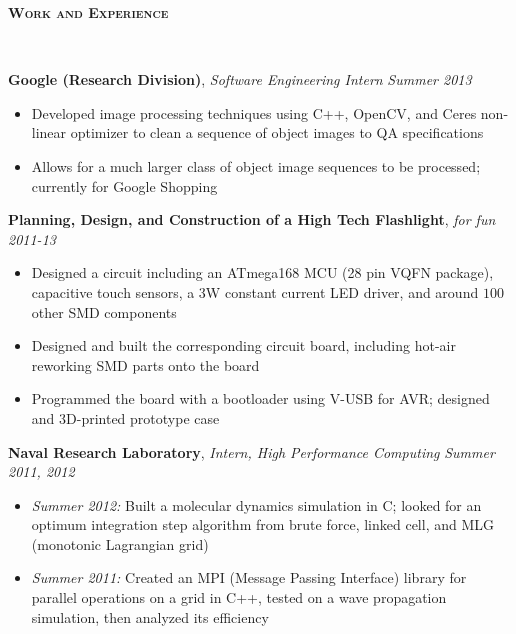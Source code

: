 \documentclass{article}
\newenvironment{changemargin}[2]{%
  \begin{list}{}{%
    \setlength{\topsep}{0pt}%
    \setlength{\leftmargin}{#1}%
    \setlength{\rightmargin}{#2}%
    \setlength{\listparindent}{\parindent}%
    \setlength{\itemindent}{\parindent}%
    \setlength{\parsep}{\parskip}%
  }%
  \item[]}{\end{list}
}
\newcommand{\lineover}{
	\begin{changemargin}{-0.05in}{-0.05in}
		\vspace*{-8pt}
		\hrulefill \\
		\vspace*{-2pt}
	\end{changemargin}
}
\newcommand{\header}[1]{
	\begin{changemargin}{-0.5in}{-0.5in}
		{\large \textbf{\scshape{#1}}}\\
  	\lineover
	\end{changemargin}
}
\newenvironment{body} {
	\vspace*{-16pt}
	\begin{changemargin}{-0.25in}{-0.5in}
  }	
	{\end{changemargin}
}
\begin{document}
\smallskip


\header{Work and Experience}

\begin{body}
	\vspace{14pt}
	\textbf{Google (Research Division)}, \emph{Software Engineering Intern} \hfill \emph{Summer 2013}\\
	\vspace*{-4pt}
	\begin{itemize}
		\item Developed image processing techniques using C++, OpenCV, and Ceres non-linear optimizer to clean a sequence of object images to QA specifications
		\item Allows for a much larger class of object image sequences to be processed; currently for Google Shopping
	\end{itemize}
	
	\medskip
	
	\textbf{Planning, Design, and Construction of a High Tech Flashlight}, \emph{for fun} \hfill \emph{2011-13}\\
	\vspace*{-4pt}
	\begin{itemize}
		\item Designed a circuit including an ATmega168 MCU (28 pin VQFN package), capacitive touch sensors, a 3W constant current LED driver, and around $100$ other SMD components
		\item Designed and built the corresponding circuit board, including hot-air reworking SMD parts onto the board
		\item Programmed the board with a bootloader using V-USB for AVR; designed and 3D-printed prototype case
	\end{itemize}

	\medskip

	\textbf{Naval Research Laboratory}, \emph{Intern, High Performance Computing} \hfill \emph{Summer 2011, 2012}\\
	\vspace*{-4pt}
	\begin{itemize}
		\item \emph{Summer 2012:} Built a molecular dynamics simulation in C; looked for an optimum integration step algorithm from brute force, linked cell, and MLG (monotonic Lagrangian grid)
		\item \emph{Summer 2011:} Created an MPI (Message Passing Interface) library for parallel operations on a grid in C++, tested on a wave propagation simulation, then analyzed its efficiency
	\end{itemize}


\end{body}
\end{document}
